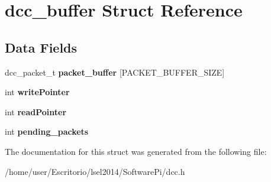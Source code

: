 \hypertarget{structdcc__buffer}{\section{dcc\-\_\-buffer \-Struct \-Reference}
\label{structdcc__buffer}
}
\subsection*{\-Data \-Fields}
\begin{DoxyCompactItemize}
\item 
\hypertarget{structdcc__buffer_a46fe437a3f0e2e4b15b69e0199e1c2a4}{dcc\-\_\-packet\-\_\-t {\bfseries packet\-\_\-buffer} \mbox{[}\-P\-A\-C\-K\-E\-T\-\_\-\-B\-U\-F\-F\-E\-R\-\_\-\-S\-I\-Z\-E\mbox{]}}\label{structdcc__buffer_a46fe437a3f0e2e4b15b69e0199e1c2a4}

\item 
\hypertarget{structdcc__buffer_a8709c2b93103afb40d4aa2b6762d860f}{int {\bfseries write\-Pointer}}\label{structdcc__buffer_a8709c2b93103afb40d4aa2b6762d860f}

\item 
\hypertarget{structdcc__buffer_a5bc811d9712cc7f68e7935cb1052cf6f}{int {\bfseries read\-Pointer}}\label{structdcc__buffer_a5bc811d9712cc7f68e7935cb1052cf6f}

\item 
\hypertarget{structdcc__buffer_af48034857c3e2729673f202f4f519748}{int {\bfseries pending\-\_\-packets}}\label{structdcc__buffer_af48034857c3e2729673f202f4f519748}

\end{DoxyCompactItemize}


\-The documentation for this struct was generated from the following file\-:\begin{DoxyCompactItemize}
\item 
/home/user/\-Escritorio/lsel2014/\-Software\-Pi/dcc.\-h\end{DoxyCompactItemize}
